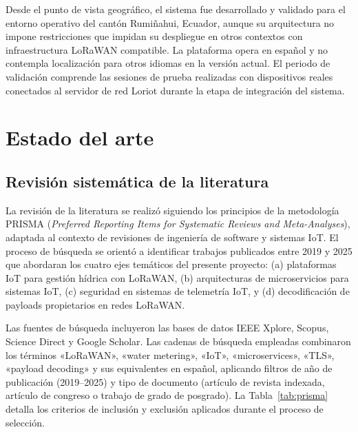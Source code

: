 \documentclass[12pt,a4paper,oneside]{report}
\begin{document}
Desde el punto de vista geográfico, el sistema fue desarrollado y validado para el entorno operativo del cantón Rumiñahui, Ecuador, aunque su arquitectura no impone restricciones que impidan su despliegue en otros contextos con infraestructura LoRaWAN compatible. La plataforma opera en español y no contempla localización para otros idiomas en la versión actual. El periodo de validación comprende las sesiones de prueba realizadas con dispositivos reales conectados al servidor de red Loriot durante la etapa de integración del sistema.

\chapter{Estado del arte}

\section{Revisión sistemática de la literatura}\label{revision-sistematica}

La revisión de la literatura se realizó siguiendo los principios de la metodología PRISMA (\textit{Preferred Reporting Items for Systematic Reviews and Meta-Analyses}), adaptada al contexto de revisiones de ingeniería de software y sistemas IoT. El proceso de búsqueda se orientó a identificar trabajos publicados entre 2019 y 2025 que abordaran los cuatro ejes temáticos del presente proyecto: (a) plataformas IoT para gestión hídrica con LoRaWAN, (b) arquitecturas de microservicios para sistemas IoT, (c) seguridad en sistemas de telemetría IoT, y (d) decodificación de payloads propietarios en redes LoRaWAN.

Las fuentes de búsqueda incluyeron las bases de datos IEEE Xplore, Scopus, Science Direct y Google Scholar. Las cadenas de búsqueda empleadas combinaron los términos «LoRaWAN», «water metering», «IoT», «microservices», «TLS», «payload decoding» y sus equivalentes en español, aplicando filtros de año de publicación (2019--2025) y tipo de documento (artículo de revista indexada, artículo de congreso o trabajo de grado de posgrado). La Tabla~\ref{tab:prisma} detalla los criterios de inclusión y exclusión aplicados durante el proceso de selección.
\end{document}
